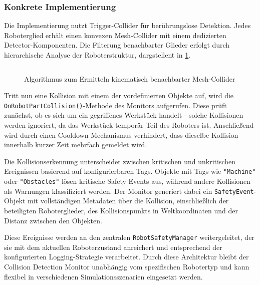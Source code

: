 \subsubsection{Konkrete Implementierung}
\noindent
Die Implementierung nutzt Trigger-Collider für berührungslose Detektion. Jedes
Roboterglied erhält einen konvexen Mesh-Collider mit einem dedizierten
Detector-Komponenten. Die Filterung benachbarter Glieder erfolgt durch hierarchische Analyse der
Roboterstruktur, dargstellent in \ref{listing:adjacentFrames}.

\begin{figure}[H]
	\inputminted[fontsize=\footnotesize]{csharp}{code-snippets/SetupAdjacentFramesIgnoring.cs}
	\caption{Algorithmus zum Ermitteln kinematisch benachbarter Mesh-Collider}
	\label{listing:adjacentFrames}
\end{figure}
\noindent
Tritt nun eine Kollision mit einem der vordefinierten Objekte auf, wird die
\texttt{OnRobotPartCollision()}-Methode des Monitors aufgerufen. Diese prüft
zunächst, ob es sich um ein gegriffenes Werkstück handelt - solche Kollisionen
werden ignoriert, da das Werkstück temporär Teil des Roboters ist. Anschließend
wird durch einen Cooldown-Mechanismus verhindert, dass dieselbe Kollision
innerhalb kurzer Zeit mehrfach gemeldet wird.

\noindent
Die Kollisionserkennung unterscheidet zwischen kritischen und unkritischen
Ereignissen basierend auf konfigurierbaren Tags. Objekte mit Tags wie
\texttt{"Machine"} oder \texttt{"Obstacles"} lösen kritische Safety Events aus,
während andere Kollisionen als Warnungen klassifiziert werden. Der Monitor
generiert dabei ein \texttt{SafetyEvent}-Objekt mit vollständigen Metadaten
über die Kollision, einschließlich der beteiligten Roboterglieder, des
Kollisionspunkts in Weltkoordinaten und der Distanz zwischen den Objekten.

\noindent
Diese Ereignisse werden an den zentralen \texttt{RobotSafetyManager}
weitergeleitet, der sie mit dem aktuellen Roboterzustand anreichert und
entsprechend der konfigurierten Logging-Strategie verarbeitet. Durch diese
Architektur bleibt der Collision Detection Monitor unabhängig vom spezifischen
Robotertyp und kann flexibel in verschiedenen Simulationsszenarien eingesetzt
werden.



